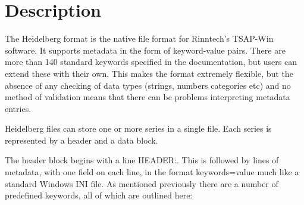 \section{Description}

The Heidelberg format \citep{tsap} is the native file format for Rinntech's TSAP-Win software. It supports metadata in the form of keyword-value pairs. There are more than 140 standard keywords specified in the documentation, but users can extend these with their own. This makes the format extremely flexible, but the absence of any checking of data types (strings, numbers categories etc) and no method of validation means that there can be problems interpreting metadata entries.

Heidelberg files can store one or more series in a single file. Each series is represented by a header and a data block.

The header block begins with a line HEADER:. This is followed by lines of metadata, with one field on each line, in the format keywords=value much like a standard Windows INI file. As mentioned previously there are a number of predefined keywords, all of which are outlined here:

